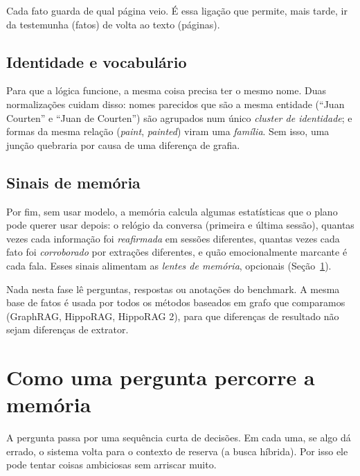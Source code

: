 \documentclass[11pt]{article}
\begin{document}
Cada fato guarda de qual página veio. É essa ligação que permite, mais tarde,
ir da testemunha (fatos) de volta ao texto (páginas).

\subsection{Identidade e vocabulário}

Para que a lógica funcione, a mesma coisa precisa ter o mesmo nome. Duas
normalizações cuidam disso: nomes parecidos que são a mesma entidade
(``Juan Courten'' e ``Juan de Courten'') são agrupados num único
\emph{cluster de identidade}; e formas da mesma relação (\emph{paint},
\emph{painted}) viram uma \emph{família}. Sem isso, uma junção quebraria por
causa de uma diferença de grafia.

\subsection{Sinais de memória}

Por fim, sem usar modelo, a memória calcula algumas estatísticas que o plano
pode querer usar depois: o relógio da conversa (primeira e última sessão),
quantas vezes cada informação foi \emph{reafirmada} em sessões diferentes,
quantas vezes cada fato foi \emph{corroborado} por extrações diferentes, e
quão emocionalmente marcante é cada fala. Esses sinais alimentam as
\emph{lentes de memória}, opcionais (Seção~\ref{sec:percurso}).

\begin{cuidado}
Nada nesta fase lê perguntas, respostas ou anotações do benchmark. A mesma
base de fatos é usada por todos os métodos baseados em grafo que comparamos
(GraphRAG, HippoRAG, HippoRAG 2), para que diferenças de resultado não sejam
diferenças de extrator.
\end{cuidado}

\section{Como uma pergunta percorre a memória}\label{sec:percurso}

\begin{ideia}
A pergunta passa por uma sequência curta de decisões. Em cada uma, se algo
dá errado, o sistema volta para o contexto de reserva (a busca híbrida). Por
isso ele pode tentar coisas ambiciosas sem arriscar muito.
\end{ideia}
\end{document}
